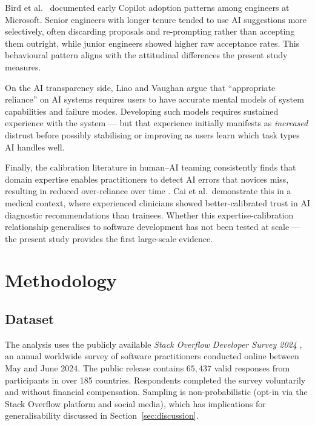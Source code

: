 \documentclass[11pt,a4paper]{article}
\begin{document}
Bird et al.\ \cite{bird2022copilot} documented early Copilot adoption patterns among
engineers at Microsoft. Senior engineers with longer tenure tended to use AI suggestions
more selectively, often discarding proposals and re-prompting rather than accepting them
outright, while junior engineers showed higher raw acceptance rates. This behavioural
pattern aligns with the attitudinal differences the present study measures.

On the AI transparency side, Liao and Vaughan \cite{liao2023transparency} argue that
``appropriate reliance'' on AI systems requires users to have accurate mental models of
system capabilities and failure modes. Developing such models requires sustained experience
with the system --- but that experience initially manifests as \emph{increased} distrust
before possibly stabilising or improving as users learn which task types AI handles well.

Finally, the calibration literature in human--AI teaming consistently finds that domain
expertise enables practitioners to detect AI errors that novices miss, resulting in reduced
over-reliance over time \cite{cai2019hello}. Cai et al.\ demonstrate this in a medical
context, where experienced clinicians showed better-calibrated trust in AI diagnostic
recommendations than trainees. Whether this expertise-calibration relationship generalises
to software development has not been tested at scale --- the present study provides the
first large-scale evidence.

\section{Methodology}
\label{sec:method}

\subsection{Dataset}

The analysis uses the publicly available \emph{Stack Overflow Developer Survey 2024}
\cite{stackoverflow2024}, an annual worldwide survey of software practitioners conducted
online between May and June 2024. The public release contains $65{,}437$ valid responses
from participants in over 185 countries. Respondents completed the survey voluntarily and
without financial compensation. Sampling is non-probabilistic (opt-in via the Stack Overflow
platform and social media), which has implications for generalisability discussed in
Section~\ref{sec:discussion}.
\end{document}
